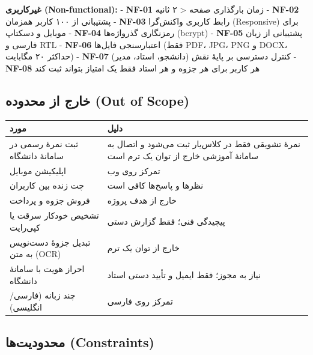 \documentclass[12pt, a4paper]{article}
\begin{document}
\textbf{غیرکاربری (Non-functional):}
- \textbf{NF-01} زمان بارگذاری صفحه \textless{} ۲ ثانیه
- \textbf{NF-02} پشتیبانی از ۱۰۰ کاربر همزمان
- \textbf{NF-03} رابط کاربری واکنش‌گرا (Responsive) برای موبایل و دسکتاپ
- \textbf{NF-04} رمزنگاری گذرواژه‌ها (bcrypt)
- \textbf{NF-05} پشتیبانی از زبان فارسی و RTL
- \textbf{NF-06} اعتبارسنجی فایل‌ها (فقط PDF، JPG، PNG و DOCX، حداکثر ۲۰ مگابایت)
- \textbf{NF-07} کنترل دسترسی بر پایهٔ نقش (دانشجو، استاد، مدیر)
- \textbf{NF-08} هر کاربر برای هر جزوه و هر استاد فقط یک امتیاز بتواند ثبت کند

\subsection{خارج از محدوده (Out of Scope)}

{\def\LTcaptype{none} %
\begin{longtable}[]{@{}
  >{\raggedright\arraybackslash}p{}
  >{\raggedright\arraybackslash}p{}@{}}
\toprule\noalign{}
\begin{minipage}[b]{\linewidth}\raggedright
مورد
\end{minipage} & \begin{minipage}[b]{\linewidth}\raggedright
دلیل
\end{minipage} \\
\midrule\noalign{}
\endhead
\bottomrule\noalign{}
\endlastfoot
ثبت نمرهٔ رسمی در سامانهٔ دانشگاه & نمرهٔ تشویقی فقط در کلاس‌یار ثبت می‌شود و اتصال به سامانهٔ آموزشی خارج از توان یک ترم است \\
اپلیکیشن موبایل & تمرکز روی وب \\
چت زنده بین کاربران & نظرها و پاسخ‌ها کافی است \\
فروش جزوه و پرداخت & خارج از هدف پروژه \\
تشخیص خودکار سرقت یا کپی‌رایت & پیچیدگی فنی؛ فقط گزارش دستی \\
تبدیل جزوهٔ دست‌نویس به متن (OCR) & خارج از توان یک ترم \\
احراز هویت با سامانهٔ دانشگاه & نیاز به مجوز؛ فقط ایمیل و تأیید دستی استاد \\
چند زبانه (فارسی/انگلیسی) & تمرکز روی فارسی \\
\end{longtable}
}

\subsection{محدودیت‌ها (Constraints)}
\end{document}
